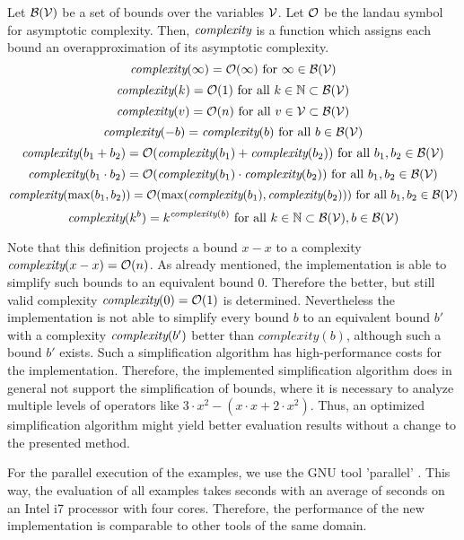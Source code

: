 \begin{definition}
  Let $\mathcal{B}(\mathcal{V})$ be a set of bounds over the variables $\mathcal{V}$.
  Let $\mathcal{O}$ be the landau symbol for asymptotic complexity.
  Then, $\emph{complexity}$ is a function which assigns each bound an overapproximation of its asymptotic complexity.
  \[ \emph{complexity}(\infty) = \mathcal{O}(\infty) \text{ for } \infty \in \mathcal{B}(\mathcal{V}) \]
  \[ \emph{complexity}(k) = \mathcal{O}(1) \text{ for all } k \in \mathbb{N} \subset \mathcal{B}(\mathcal{V}) \] 
  \[ \emph{complexity}(v) = \mathcal{O}(n) \text{ for all } v \in \mathcal{V} \subset \mathcal{B}(\mathcal{V}) \] 
  \[ \emph{complexity}(-b) = \emph{complexity}(b) \text{ for all } b \in \mathcal{B}(\mathcal{V}) \] 
  \[ \emph{complexity}(b_1 + b_2) = \mathcal{O}(\emph{complexity}(b_1) + \emph{complexity}(b_2)) \text{ for all } b_1, b_2 \in \mathcal{B}(\mathcal{V}) \] 
  \[ \emph{complexity}(b_1 \cdot b_2) = \mathcal{O}(\emph{complexity}(b_1) \cdot \emph{complexity}(b_2)) \text{ for all } b_1, b_2 \in \mathcal{B}(\mathcal{V}) \] 
  \[ \emph{complexity}(\max(b_1, b_2)) = \mathcal{O}(\max(\emph{complexity}(b_1), \emph{complexity}(b_2))) \text{ for all } b_1, b_2 \in \mathcal{B}(\mathcal{V}) \]
  \[ \emph{complexity}(k^b) = k^{\emph{complexity}(b)} \text{ for all } k \in \mathbb{N} \subset \mathcal{B}(\mathcal{V}), b \in \mathcal{B}(\mathcal{V}) \]  
\end{definition}

Note that this definition projects a bound $x-x$ to a complexity $\emph{complexity}(x-x) = \mathcal{O}(n)$.
As already mentioned, the implementation is able to simplify such bounds to an equivalent bound $0$.
Therefore the better, but still valid complexity $\emph{complexity}(0) = \mathcal{O}(1)$ is determined.
Nevertheless the implementation is not able to simplify every bound $b$ to an equivalent bound $b'$ with a complexity $\emph{complexity}(b')$ better than $complexity(b)$, although such a bound $b'$ exists.
Such a simplification algorithm has high-performance costs for the implementation.
Therefore, the implemented simplification algorithm does in general not support the simplification of bounds, where it is necessary to analyze multiple levels of operators like $3 \cdot x^2-(x \cdot x+2 \cdot x^2)$.
Thus, an optimized simplification algorithm might yield better evaluation results without a change to the presented method.

For the parallel execution of the examples, we use the GNU tool 'parallel' \cite{gnuparallel}.
This way, the evaluation of all examples takes  seconds with an average of  seconds on an Intel i7 processor with four cores.
Therefore, the performance of the new implementation is comparable to other tools of the same domain.

